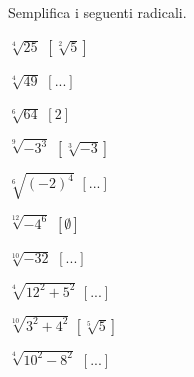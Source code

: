 \begin{esercizio}[\Ast]
 \label{ese:2.24}
Semplifica i seguenti radicali.
\vspace{-.5em}
 \begin{multicols}{3}
 \begin{enumeratea}
 \item \(\sqrt[4]{25}\) \hfill \(\left[\sqrt[2]{5}\right]\)
 \item \(\sqrt[4]{49}\)
  \hfill \(\left[...\right]\)
 \item \(\sqrt[6]{64}\)
  \hfill \(\left[2\right]\)
%  
 \item \(\sqrt[9]{-3^3}\)
  \hfill \(\left[\sqrt[3]{-3}\right]\)
 \item \(\sqrt[6]{(-2)^4}\)
  \hfill \(\left[...\right]\)
 \item \(\sqrt[12]{-4^6}\)
  \hfill \(\left[\emptyset\right]\)
 \item \(\sqrt[10]{-32}\)
  \hfill \(\left[...\right]\)
 \item \(\sqrt[4]{12^2+5^2}\)
  \hfill \(\left[...\right]\)
 \item \(\sqrt[10]{3^2+4^2}\)
  \hfill \(\left[\sqrt[5]5\right]\)
 \item \(\sqrt[4]{10^2-8^2}\)
  \hfill \(\left[...\right]\)

\end{enumeratea}
\end{multicols}
\end{esercizio}
